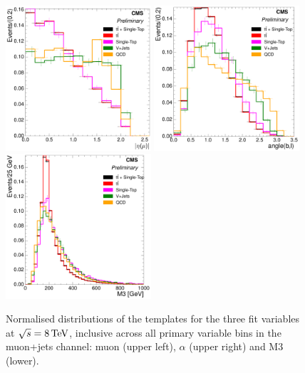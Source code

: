 \begin{figure}[hbtp]
    \centering
     \includegraphics[width=0.48\textwidth]{Chapters/04_Analysis/04b_XSections/images/8TeV/fit_variables/muon/MET/muon_absolute_eta/MET_inclusive_muon_absolute_eta_2orMoreBtags_templates.pdf}\hfill
     \includegraphics[width=0.48\textwidth]{Chapters/04_Analysis/04b_XSections/images/8TeV/fit_variables/muon/MET/angle_bl/MET_inclusive_angle_bl_2orMoreBtags_templates.pdf}
     \includegraphics[width=0.48\textwidth]{Chapters/04_Analysis/04b_XSections/images/8TeV/fit_variables/muon/MET/M3/MET_inclusive_M3_2orMoreBtags_templates.pdf}\\
	 \caption{Normalised distributions of the templates for the three fit variables at $\sqrt{s}=8\,\text{Te\hspace{-.08em}V}$,
	 inclusive across all primary variable bins in the muon+jets channel: muon \abseta (upper left),
	 $\alpha$ (upper right) and M3 (lower).}
     \label{fig:fit_variable_distributions_muon_8TeV}
\end{figure}

